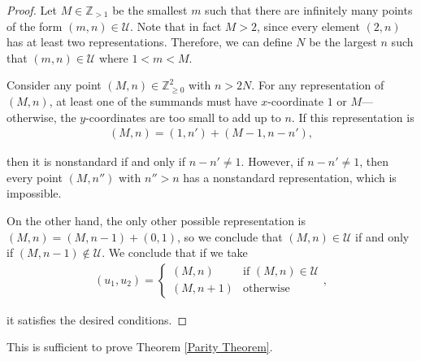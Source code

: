 \documentclass{amsart}
\newcommand{\ZZ}{\mathbb{Z}}
\newcommand{\U}{\mathcal{U}}
\theoremstyle{theorem}
\theoremstyle{definition}
\begin{document}
\begin{proof}
Let $M \in \ZZ_{> 1}$ be the smallest $m$ such that there are infinitely many points of the form $(m,n) \in \U$. Note that in fact $M > 2$, since every element $(2,n)$ has at least two representations. Therefore, we can define $N$ be the largest $n$ such that $(m,n) \in \U$ where $1 < m < M$.

Consider any point $(M,n) \in \ZZ_{\geq 0}^2$ with $n > 2N$. For any representation of $(M,n)$, at least one of the summands must have $x$-coordinate $1$ or $M$---otherwise, the $y$-coordinates are too small to add up to $n$. If this representation is
	\begin{align*}
    (M,n) = (1,n') + (M - 1, n - n'),
    \end{align*}
    
\noindent then it is nonstandard if and only if $n - n' \neq 1$. However, if $n - n' \neq 1$, then every point $(M,n'')$ with $n'' > n$ has a nonstandard representation, which is impossible.

On the other hand, the only other possible representation is $(M,n) = (M,n - 1) + (0,1)$, so we conclude that $(M,n) \in \U$ if and only if $(M,n - 1) \notin \U$. We conclude that if we take
	\begin{align*}
    (u_1, u_2) = \begin{cases} (M,n) & \text{if } (M,n) \in \U \\ (M, n + 1) & \text{otherwise} \end{cases},
    \end{align*}
    
\noindent it satisfies the desired conditions.
\end{proof}

This is sufficient to prove Theorem \ref{Parity Theorem}.
\end{document}
